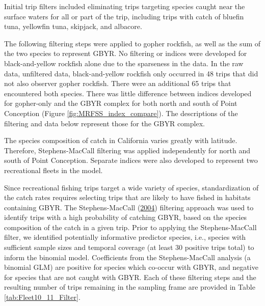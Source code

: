 \documentclass[12pt,]{article}
\begin{document}
Initial trip filters included eliminating trips targeting species caught
near the surface waters for all or part of the trip, including trips
with catch of bluefin tuna, yellowfin tuna, skipjack, and albacore.

The following filtering steps were applied to gopher rockfish, as well
as the sum of the two species to represent GBYR. No filtering or indices
were developed for black-and-yellow rockfish alone due to the sparseness
in the data. In the raw data, unfiltered data, black-and-yellow rockfish
only occurred in 48 trips that did not also observer gopher rockfish.
There were an additional 65 trips that encountered both species. There
was little difference between indices developed for gopher-only and the
GBYR complex for both north and south of Point Conception (Figure
\ref{fig:MRFSS_index_compare}). The descriptions of the filtering and
data below represent those for the GBYR complex.

The species composition of catch in California varies greatly with
latitude.\\
Therefore, Stephens-MacCall filtering was applied independently for
north and south of Point Conception. Separate indices were also
developed to represent two recreational fleets in the model.

Since recreational fishing trips target a wide variety of species,
standardization of the catch rates requires selecting trips that are
likely to have fished in habitats containing GBYR. The Stephens-MacCall
(\protect\hyperlink{ref-Stephens2004}{2004}) filtering approach was used
to identify trips with a high probability of catching GBYR, based on the
species composition of the catch in a given trip. Prior to applying the
Stephens-MacCall filter, we identified potentially informative predictor
species, i.e., species with sufficient sample sizes and temporal
coverage (at least 30 positive trips total) to inform the binomial
model. Coefficients from the Stephens-MacCall analysis (a binomial GLM)
are positive for species which co-occur with GBYR, and negative for
species that are not caught with GBYR. Each of these filtering steps and
the resulting number of trips remaining in the sampling frame are
provided in Table \ref{tab:Fleet10_11_Filter}.
\end{document}
